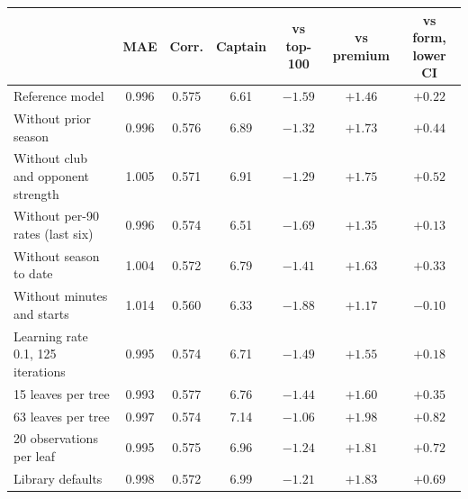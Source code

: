 \begin{tabular}{lcccccc}
\toprule
 & MAE & Corr. & Captain & vs top-100 & vs premium & vs form, lower CI \\
\midrule
Reference model & 0.996 & 0.575 & 6.61 & $-1.59$ & $+1.46$ & $+0.22$ \\
\midrule
Without prior season & 0.996 & 0.576 & 6.89 & $-1.32$ & $+1.73$ & $+0.44$ \\
Without club and opponent strength & 1.005 & 0.571 & 6.91 & $-1.29$ & $+1.75$ & $+0.52$ \\
Without per-90 rates (last six) & 0.996 & 0.574 & 6.51 & $-1.69$ & $+1.35$ & $+0.13$ \\
Without season to date & 1.004 & 0.572 & 6.79 & $-1.41$ & $+1.63$ & $+0.33$ \\
Without minutes and starts & 1.014 & 0.560 & 6.33 & $-1.88$ & $+1.17$ & $-0.10$ \\
\midrule
Learning rate 0.1, 125 iterations & 0.995 & 0.574 & 6.71 & $-1.49$ & $+1.55$ & $+0.18$ \\
15 leaves per tree & 0.993 & 0.577 & 6.76 & $-1.44$ & $+1.60$ & $+0.35$ \\
63 leaves per tree & 0.997 & 0.574 & 7.14 & $-1.06$ & $+1.98$ & $+0.82$ \\
20 observations per leaf & 0.995 & 0.575 & 6.96 & $-1.24$ & $+1.81$ & $+0.72$ \\
Library defaults & 0.998 & 0.572 & 6.99 & $-1.21$ & $+1.83$ & $+0.69$ \\
\bottomrule
\end{tabular}
